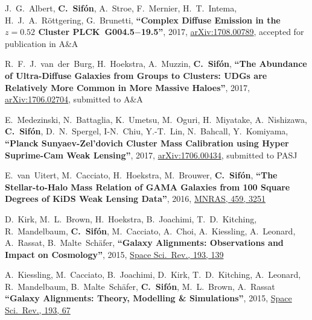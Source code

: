 \documentclass{article}
\def\myself{\textbf{\color{red} C.~Sif\'on}}
\def\aap{A\&A}
\def\mnras{MNRAS}
\def\pasj{PASJ}
\def\ssr{Space Sci.\ Rev.}
\newcommand{\accepted}[1]{accepted for publication in #1}
\newcommand{\submitted}[1]{submitted to #1}
\newcommand{\paper}[1]{\textbf{``#1''}}
\begin{document}
\vspace{-0.5cm}
\begin{etaremune}

\item
J.~G.~Albert, \myself, A.~Stroe, F.~Mernier, H.~T.~Intema, H.~J.~A.~R\"ottgering, 
G.~Brunetti,
\paper{Complex Diffuse Emission in the $z=0.52$ Cluster PLCK~G004.5$-$19.5},
2017, \href{http://adsabs.harvard.edu/abs/2017arXiv17078.00789}{arXiv:1708.00789}, 
\accepted{\aap}

\item
R.~F.~J.~van~der~Burg, H.~Hoekstra, A.~Muzzin, \myself, 
\paper{The Abundance of Ultra-Diffuse Galaxies from Groups to Clusters: UDGs 
are Relatively More Common in More Massive Haloes},
2017, \href{http://adsabs.harvard.edu/abs/2017arXiv170602704V}{arXiv:1706.02704},
\submitted{\aap}

\item
E.~Medezinski, N.~Battaglia, K.~Umetsu, M.~Oguri, H.~Miyatake, A.~Nishizawa,
\myself, D.~N.~Spergel, I-N.~Chiu, Y.-T.~Lin, N.~Bahcall, Y.~Komiyama,
\paper{Planck Sunyaev-Zel'dovich Cluster Mass Calibration using Hyper 
Suprime-Cam Weak
Lensing},
2017, \href{http://adsabs.harvard.edu/abs/2017arXiv170600434M}{arXiv:1706.00434},
\submitted{\pasj}

\item
E.~van~Uitert, M.~Cacciato, H.~Hoekstra, M.~Brouwer, \myself, 
\paper{The Stellar-to-Halo Mass Relation of GAMA Galaxies from 100 Square Degrees of KiDS Weak Lensing Data},
2016, \href{http://adsabs.harvard.edu/abs/2016MNRAS.459.3251V}{\mnras, 459, 3251}

\item
D.~Kirk, M.~L.~Brown, H.~Hoekstra, B.~Joachimi, T.~D.~Kitching, R.~Mandelbaum, \myself, 
M.~Cacciato, A.~Choi, A.~Kiessling, A.~Leonard, A.~Rassat, B.~Malte~Sch\"afer,
\paper{Galaxy Alignments: Observations and Impact on Cosmology},
2015, \href{http://adsabs.harvard.edu/doi/10.1007/s11214-015-0213-4}{\ssr, 193, 139}

\item
A.~Kiessling, M.~Cacciato, B.~Joachimi, D.~Kirk, T.~D.~Kitching, A.~Leonard, R.~Mandelbaum, 
B.~Malte~Sch\"afer, \myself, M.~L.~Brown, A.~Rassat
\paper{Galaxy Alignments: Theory, Modelling \& Simulations},
2015, \href{http://adsabs.harvard.edu/doi/10.1007/s11214-015-0203-6}{\ssr, 193, 67}


\end{etaremune}
\end{document}
